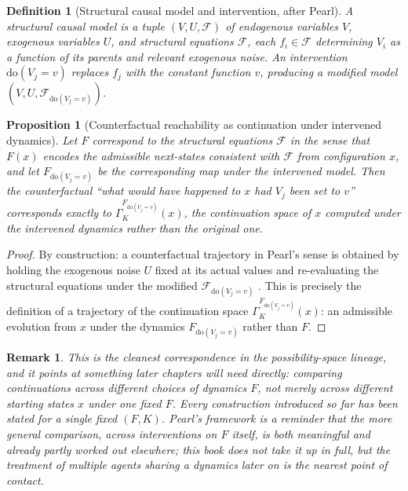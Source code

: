 \documentclass[11pt]{report}
\newtheorem{proposition}{Proposition}[chapter]
\newtheorem{definition}{Definition}[chapter]
\newtheorem{remark}{Remark}[chapter]
\begin{document}
\begin{definition}[Structural causal model and intervention, after Pearl]
A structural causal model is a tuple $(V, U, \mathcal{F})$ of endogenous
variables $V$, exogenous variables $U$, and structural equations
$\mathcal{F}$, each $f_i \in \mathcal{F}$ determining $V_i$ as a function
of its parents and relevant exogenous noise. An intervention
$\mathrm{do}(V_j = v)$ replaces $f_j$ with the constant function $v$,
producing a modified model $(V, U, \mathcal{F}_{\mathrm{do}(V_j=v)})$.
\end{definition}

\begin{proposition}[Counterfactual reachability as continuation under intervened dynamics]
Let $F$ correspond to the structural equations $\mathcal{F}$ in the
sense that $F(x)$ encodes the admissible next-states consistent with
$\mathcal{F}$ from configuration $x$, and let $F_{\mathrm{do}(V_j=v)}$
be the corresponding map under the intervened model. Then the
counterfactual ``what would have happened to $x$ had $V_j$ been set to
$v$'' corresponds exactly to $\Gamma_K^{F_{\mathrm{do}(V_j=v)}}(x)$, the
continuation space of $x$ computed under the intervened dynamics rather
than the original one.
\end{proposition}
\begin{proof}
By construction: a counterfactual trajectory in Pearl's sense is
obtained by holding the exogenous noise $U$ fixed at its actual values
and re-evaluating the structural equations under the modified
$\mathcal{F}_{\mathrm{do}(V_j=v)}$ \cite{pearl2000}. This is precisely
the definition of a trajectory of the continuation space
$\Gamma_K^{F_{\mathrm{do}(V_j=v)}}(x)$: an admissible evolution from $x$
under the dynamics $F_{\mathrm{do}(V_j=v)}$ rather than $F$.
\end{proof}

\begin{remark}
This is the cleanest correspondence in the possibility-space lineage,
and it points at something later chapters will need directly: comparing
continuations across different choices of dynamics $F$, not merely
across different starting states $x$ under one fixed $F$. Every
construction introduced so far has been stated for a single fixed
$(F,K)$. Pearl's framework is a reminder that the more general
comparison, across interventions on $F$ itself, is both meaningful and
already partly worked out elsewhere; this book does not take it up in
full, but the treatment of multiple agents sharing a dynamics later on
is the nearest point of contact.
\end{remark}
\end{document}
